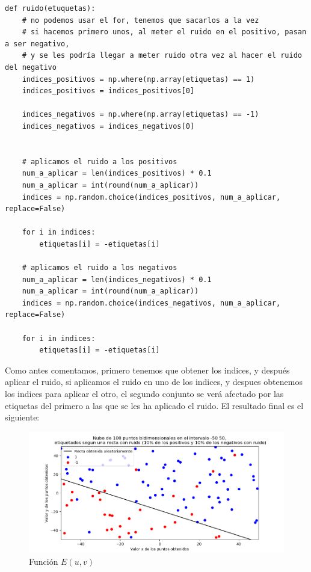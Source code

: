 \documentclass[12pt, spanish]{article}
\begin{document}
\begin{lstlisting}
def ruido(etuquetas):
	# no podemos usar el for, tenemos que sacarlos a la vez
	# si hacemos primero unos, al meter el ruido en el positivo, pasan a ser negativo,
	# y se les podría llegar a meter ruido otra vez al hacer el ruido del negativo
	indices_positivos = np.where(np.array(etiquetas) == 1)
	indices_positivos = indices_positivos[0]

	indices_negativos = np.where(np.array(etiquetas) == -1)
	indices_negativos = indices_negativos[0]


	# aplicamos el ruido a los positivos
	num_a_aplicar = len(indices_positivos) * 0.1
	num_a_aplicar = int(round(num_a_aplicar))
	indices = np.random.choice(indices_positivos, num_a_aplicar, replace=False)

	for i in indices:
		etiquetas[i] = -etiquetas[i]

	# aplicamos el ruido a los negativos
	num_a_aplicar = len(indices_negativos) * 0.1
	num_a_aplicar = int(round(num_a_aplicar))
	indices = np.random.choice(indices_negativos, num_a_aplicar, replace=False)

	for i in indices:
		etiquetas[i] = -etiquetas[i]

\end{lstlisting}

Como antes comentamos, primero tenemos que obtener los indices, y después aplicar el ruido, si aplicamos el ruido en uno de los indices, y despues obtenemos los indices para aplicar el otro, el segundo conjunto se verá afectado por las etiquetas del primero a las que se les ha aplicado el ruido. El resultado final es el siguiente:


\begin{figure}[H]
  \centering
      \includegraphics[scale = 0.70]{ej-1-2-2-ruido.png}
 		 \caption{Función $E(u,v)$}
  		\label{fig:ej1-2}

\end{figure}
\end{document}
